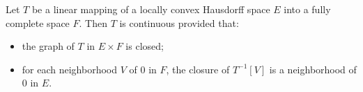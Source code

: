 Let $T$ be a linear mapping of a locally convex Hausdorff space $E$ into a fully complete space $F$. Then $T$ is continuous provided that:
\begin{itemize}
\item[(i)] the graph of $T$ in $E \times F$ is closed;
\item[(ii)] for each neighborhood $V$ of $0$ in $F$, the closure of $T^{-1}[V]$ is a neighborhood of $0$ in $E$.
\end{itemize}
